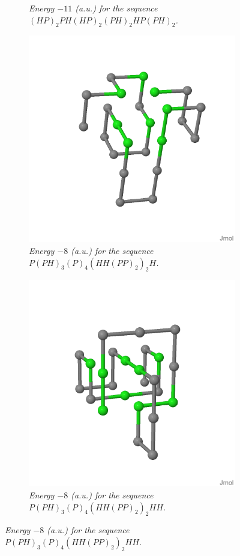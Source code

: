 \begin{figure}[H]
\begin{subfigure}[b]{0.45\textwidth}
        \caption{\emph{Energy $-11$ (a.u.) for the sequence $(HP)_2PH(HP)_2(PH)_2HP(PH)_2$.}}
    \end{subfigure}
    \begin{subfigure}[b]{0.45\textwidth}
        \centering
        \includegraphics[width=\textwidth]{./img/24_3D.png}
        \caption{\emph{Energy $-8$ (a.u.) for the sequence $P(PH)_3(P)_4(HH(PP)_2)_2H$.}}
    \end{subfigure}
    \begin{subfigure}[b]{0.45\textwidth}
        \centering
        \includegraphics[width=\textwidth]{./img/25_3D.png}
        \caption{\emph{Energy $-8$ (a.u.) for the sequence $P(PH)_3(P)_4(HH(PP)_2)_2HH$.}}
    \end{subfigure}


\end{figure}
